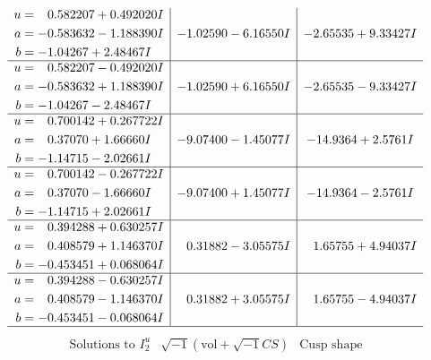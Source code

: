 \documentclass[1p]{elsarticle_modified}
\theoremstyle{definition}
\newcommand{\I}{\sqrt{-1}}
\begin{document}
$$\begin{array}{c|c|c}
\begin{aligned}
u &= \phantom{-}0.582207 + 0.492020 I \\
a &= -0.583632 - 1.188390 I \\
b &= -1.04267 + 2.48467 I\end{aligned}
 & -1.02590 - 6.16550 I & -2.65535 + 9.33427 I \\ \hline\begin{aligned}
u &= \phantom{-}0.582207 - 0.492020 I \\
a &= -0.583632 + 1.188390 I \\
b &= -1.04267 - 2.48467 I\end{aligned}
 & -1.02590 + 6.16550 I & -2.65535 - 9.33427 I \\ \hline\begin{aligned}
u &= \phantom{-}0.700142 + 0.267722 I \\
a &= \phantom{-}0.37070 + 1.66660 I \\
b &= -1.14715 - 2.02661 I\end{aligned}
 & -9.07400 - 1.45077 I & -14.9364 + 2.5761 I \\ \hline\begin{aligned}
u &= \phantom{-}0.700142 - 0.267722 I \\
a &= \phantom{-}0.37070 - 1.66660 I \\
b &= -1.14715 + 2.02661 I\end{aligned}
 & -9.07400 + 1.45077 I & -14.9364 - 2.5761 I \\ \hline\begin{aligned}
u &= \phantom{-}0.394288 + 0.630257 I \\
a &= \phantom{-}0.408579 + 1.146370 I \\
b &= -0.453451 + 0.068064 I\end{aligned}
 & \phantom{-}0.31882 - 3.05575 I & \phantom{-}1.65755 + 4.94037 I \\ \hline\begin{aligned}
u &= \phantom{-}0.394288 - 0.630257 I \\
a &= \phantom{-}0.408579 - 1.146370 I \\
b &= -0.453451 - 0.068064 I\end{aligned}
 & \phantom{-}0.31882 + 3.05575 I & \phantom{-}1.65755 - 4.94037 I\\
 \hline 
 \end{array}$$\newpage$$\begin{array}{c|c|c}  
\text{Solutions to }I^u_{2}& \I (\text{vol} + \sqrt{-1}CS) & \text{Cusp shape}\\
 \hline 
\begin{aligned}

\end{aligned}
\end{array}$$
\end{document}
